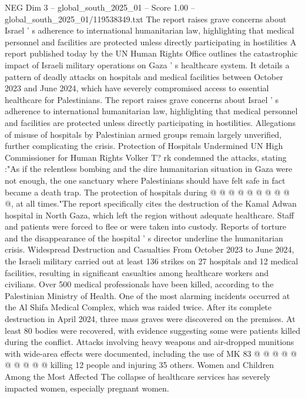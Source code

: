 \begin{textsample}{NEG Dim 3 – global\_south\_2025\_01 – Score 1.00 – global\_south\_2025\_01/119538349.txt}  \label{ex:f3_neg_080}
The report raises grave concerns about Israel ' s adherence to international humanitarian law, highlighting that medical personnel and facilities are protected unless directly participating in hostilities A report published today by the UN Human Rights Office outlines the catastrophic impact of Israeli military operations on Gaza ' s healthcare system.
It details a pattern of deadly attacks on hospitals and medical facilities between October 2023 and June 2024, which have severely compromised access to essential healthcare for Palestinians.
The report raises grave concerns about Israel ' s adherence to international humanitarian law, highlighting that medical personnel and facilities are protected unless directly participating in hostilities.
Allegations of misuse of hospitals by Palestinian armed groups remain largely unverified, further complicating the crisis.
Protection of Hospitals Undermined UN High Commissioner for Human Rights Volker T? rk condemned the attacks, stating :"As if the relentless bombing and the dire humanitarian situation in Gaza were not enough, the one sanctuary where Palestinians should have felt safe in fact became a death trap.
The protection of hospitals during @ @ @ @ @ @ @ @ @ @, at all times."The report specifically cites the destruction of the Kamal Adwan hospital in North Gaza, which left the region without adequate healthcare.
Staff and patients were forced to flee or were taken into custody.
Reports of torture and the disappearance of the hospital ' s director underline the humanitarian crisis.
Widespread Destruction and Casualties From October 2023 to June 2024, the Israeli military carried out at least 136 strikes on 27 hospitals and 12 medical facilities, resulting in significant casualties among healthcare workers and civilians.
Over 500 medical professionals have been killed, according to the Palestinian Ministry of Health.
One of the most alarming incidents occurred at the Al Shifa Medical Complex, which was raided twice.
After its complete destruction in April 2024, three mass graves were discovered on the premises.
At least 80 bodies were recovered, with evidence suggesting some were patients killed during the conflict.
Attacks involving heavy weapons and air-dropped munitions with wide-area effects were documented, including the use of MK 83 @ @ @ @ @ @ @ @ @ @ killing 12 people and injuring 35 others.
Women and Children Among the Most Affected The collapse of healthcare services has severely impacted women, especially pregnant women.

\end{textsample}
